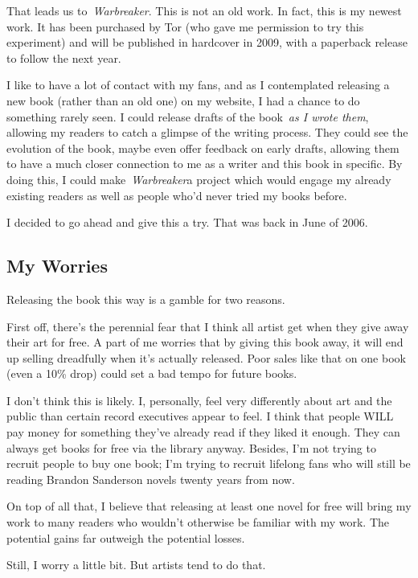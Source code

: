 That leads us to~\textit{Warbreaker}. This is not an old work. In fact, this is my newest work. It has been purchased by Tor (who gave me permission to try this experiment) and will be published in hardcover in 2009, with a paperback release to follow the next year.

I like to have a lot of contact with my fans, and as I contemplated releasing a new book (rather than an old one) on my website, I had a chance to do something rarely seen. I could release drafts of the book~\textit{as I wrote them}, allowing my readers to catch a glimpse of the writing process. They could see the evolution of the book, maybe even offer feedback on early drafts, allowing them to have a much closer connection to me as a writer and this book in specific. By doing this, I could make~\textit{Warbreaker}a project which would engage my already existing readers as well as people who’d never tried my books before.

I decided to go ahead and give this a try. That was back in June of 2006.

\subsection*{My Worries}

Releasing the book this way is a gamble for two reasons.

First off, there’s the perennial fear that I think all artist get when they give away their art for free. A part of me worries that by giving this book away, it will end up selling dreadfully when it’s actually released. Poor sales like that on one book (even a 10\% drop) could set a bad tempo for future books.

I don’t think this is likely. I, personally, feel very differently about art and the public than certain record executives appear to feel. I think that people WILL pay money for something they’ve already read if they liked it enough. They can always get books for free via the library anyway. Besides, I’m not trying to recruit people to buy one book; I’m trying to recruit lifelong fans who will still be reading Brandon Sanderson novels twenty years from now.

On top of all that, I believe that releasing at least one novel for free will bring my work to many readers who wouldn’t otherwise be familiar with my work. The potential gains far outweigh the potential losses.

Still, I worry a little bit. But artists tend to do that.

